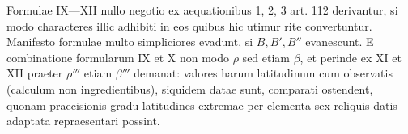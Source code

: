 Formulae IX—XII nullo negotio ex aequationibus 1, 2, 3 art. 112 derivantur, si modo characteres illic adhibiti in eos quibus hic utimur rite convertuntur. Manifesto formulae multo simpliciores evadunt, si $B,B',B''$ evanescunt. E combinatione formularum IX et X non modo $\rho$ sed etiam $\beta$, et perinde ex XI et XII praeter $\rho'''$ etiam $\beta'''$ demanat: valores harum latitudinum cum observatis (calculum non ingredientibus), siquidem datae sunt, comparati ostendent, quonam praecisionis gradu latitudines extremae per elementa sex reliquis datis adaptata repraesentari possint.

